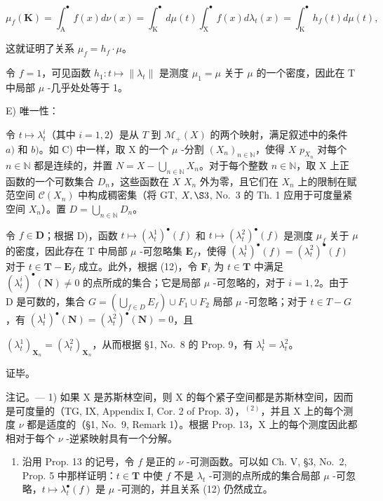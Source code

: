 \[
\mu_ {f} (\mathbf {K}) = \int_ {\mathrm{A}} ^ {\bullet} f (x) d \nu (x) = \int_ {\mathrm{K}} ^ {\bullet} d \mu (t) \int_ {\mathrm{X}} ^ {\bullet} f (x) d \lambda_ {t} (x) = \int_ {\mathrm{K}} ^ {\bullet} h _ {f} (t) d \mu (t),
\]

这就证明了关系 \(\mu_f = h_f \cdot \mu\)。

令 \(f = 1\)，可见函数 \(h_1: t \mapsto \| \lambda_t \|\) 是测度 \(\mu_1 = \mu\) 关于 \(\mu\) 的一个密度，因此在 T 中局部 \(\mu\) -几乎处处等于 1。

E) 唯一性：

令 \(t \mapsto \lambda_t^i\)（其中 \(i = 1,2\)）是从 \(T\) 到 \(\mathcal{M}_+(X)\) 的两个映射，满足叙述中的条件 \(a)\) 和 \(b)\)。如 C) 中一样，取 X 的一个 \(\mu\) -分割 \((X_n)_{n \in \mathbb{N}}\)，使得 \(X\) \(p_{X_n}\) 对每个 \(n \in \mathbb{N}\) 都是连续的，并置 \(N = X - \bigcup_{n \in \mathbb{N}} X_n\)。对于每个整数 \(n \in \mathbb{N}\)，取 X 上正函数的一个可数集合 \(D_n\)，这些函数在 \(X\) \(X_n\) 外为零，且它们在 \(X_n\) 上的限制在赋范空间 \(\mathcal{C}(X_n)\) 中构成稠密集（将 GT, \(X, \S 3\), No.~3 的 Th. 1 应用于可度量紧空间 \(X_n\)）。置 \(D = \bigcup_{n \in \mathbb{N}} D_n\)。

令 \(f \in \mathbf{D}\)；根据 D)，函数 \(t \mapsto (\lambda_t^1)^{\bullet}(f)\) 和 \(t \mapsto (\lambda_t^2)^{\bullet}(f)\) 是测度 \(\mu_f\) 关于 \(\mu\) 的密度，因此存在 T 中局部 \(\mu\) -可忽略集 \(\mathbf{E}_f\)，使得 \((\lambda_t^1)^{\bullet}(f) = (\lambda_t^2)^{\bullet}(f)\) 对于 \(t \in \mathbf{T} - \mathbf{E}_f\) 成立。此外，根据 (12)，令 \(\mathbf{F}_i\) 为 \(t \in \mathbf{T}\) 中满足 \((\lambda_t^i)^{\bullet}(\mathbf{N}) \neq 0\) 的点所成的集合；它是局部 \(\mu\) -可忽略的，对于 \(i = 1, 2\)。由于 D 是可数的，集合 \(G = \left( \bigcup_{f \in D} E_f \right) \cup F_1 \cup F_2\) 局部 \(\mu\) -可忽略；对于 \(t \in T - G\)，有 \((\lambda_t^1)^{\bullet}(\mathbf{N}) = (\lambda_t^2)^{\bullet}(\mathbf{N}) = 0\)，且

\((\lambda_t^1)_{\mathbf{X}_n} = (\lambda_t^2)_{\mathbf{X}_n}\)，从而根据 §1, No.~8 的 Prop. 9，有 \(\lambda_t^1 = \lambda_t^2\)。

证毕。

注记。--- 1) 如果 X 是苏斯林空间，则 X 的每个紧子空间都是苏斯林空间，因而是可度量的（TG, IX, Appendix I, Cor. 2 of Prop. 3），\(^{(2)}\)，并且 X 上的每个测度 \(\nu\) 都是适度的（§1, No.~9, Remark 1）。根据 Prop. 13，X 上的每个测度因此都相对于每个 \(\nu\) -逆紧映射具有一个分解。

\begin{enumerate}
\def\labelenumi{\arabic{enumi})}
\setcounter{enumi}{1}
\tightlist
\item
  沿用 Prop. 13 的记号，令 \(f\) 是正的 \(\nu\) -可测函数。可以如 Ch. V, §3, No.~2, Prop. 5 中那样证明：\(t \in \mathbf{T}\) 中使 \(f\) 不是 \(\lambda_t\) -可测的点所成的集合局部 \(\mu\) -可忽略，\(t \mapsto \lambda_t^\bullet(f)\) 是 \(\mu\) -可测的，并且关系 (12) 仍然成立。
\end{enumerate}

